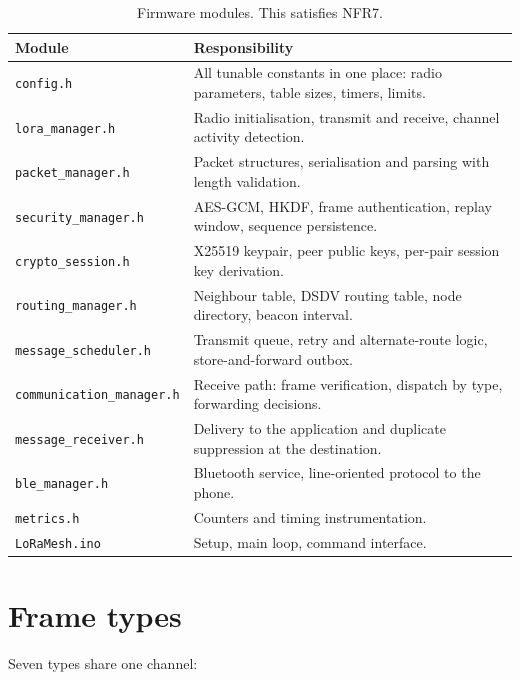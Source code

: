 \documentclass[12pt,a4paper,oneside]{report}
\begin{document}
\begin{table}[htbp]
\centering
\small
\begin{tabular}{@{}p{4.2cm}p{8.3cm}@{}}
\toprule
Module & Responsibility \\
\midrule
\texttt{config.h} & All tunable constants in one place: radio parameters, table
  sizes, timers, limits. \\
\texttt{lora\_manager.h} & Radio initialisation, transmit and receive, channel
  activity detection. \\
\texttt{packet\_manager.h} & Packet structures, serialisation and parsing with
  length validation. \\
\texttt{security\_manager.h} & AES-GCM, HKDF, frame authentication, replay
  window, sequence persistence. \\
\texttt{crypto\_session.h} & X25519 keypair, peer public keys, per-pair session
  key derivation. \\
\texttt{routing\_manager.h} & Neighbour table, DSDV routing table, node
  directory, beacon interval. \\
\texttt{message\_scheduler.h} & Transmit queue, retry and alternate-route logic,
  store-and-forward outbox. \\
\texttt{communication\_manager.h} & Receive path: frame verification, dispatch by
  type, forwarding decisions. \\
\texttt{message\_receiver.h} & Delivery to the application and duplicate
  suppression at the destination. \\
\texttt{ble\_manager.h} & Bluetooth service, line-oriented protocol to the
  phone. \\
\texttt{metrics.h} & Counters and timing instrumentation. \\
\texttt{LoRaMesh.ino} & Setup, main loop, command interface. \\
\bottomrule
\end{tabular}
\caption{Firmware modules. This satisfies NFR7.}
\label{tab:modules}
\end{table}

\section{Frame types}

Seven types share one channel:
\end{document}

